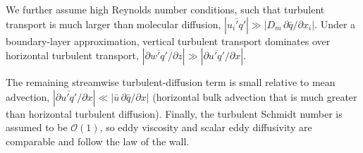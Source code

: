 \documentclass{article}
\begin{document}
    We further assume high Reynolds number conditions, such that turbulent transport is much larger than molecular diffusion,
    $\left| \overline{u_i' q'} \right| \gg \left| D_m\,\partial \bar q/\partial x_i \right|$.
    Under a boundary-layer approximation, vertical turbulent transport dominates over horizontal
    turbulent transport,   $\left| \partial \overline{w' q'} / \partial z \right| \gg \left| \partial \overline{u' q'} / \partial x \right|$.

    The remaining streamwise turbulent-diffusion term is small relative to mean advection,
    $\left| \partial \overline{u' q'} / \partial x \right| \ll \left| \bar u\,\partial \bar q/\partial x \right|$ (horizontal bulk advection that is much greater than horizontal turbulent diffusion). 
     Finally, the turbulent Schmidt number is assumed to be ${\mathcal O}(1)$,  so eddy viscosity and scalar eddy diffusivity are comparable and follow the law of the wall.


\end{document}
